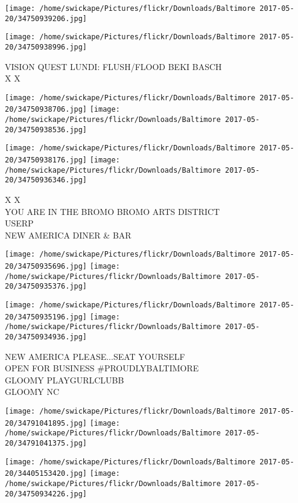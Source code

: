 \documentclass[10pt,letterpaper]{article}
\begin{document}
\texttt{[image: /home/swickape/Pictures/flickr/Downloads/Baltimore 2017-05-20/34750939206.jpg]}

\vspace{0.25in}
\texttt{[image: /home/swickape/Pictures/flickr/Downloads/Baltimore 2017-05-20/34750938996.jpg]}

VISION QUEST LUNDI: FLUSH/FLOOD BEKI BASCH\\
X X\\
\pagebreak

\texttt{[image: /home/swickape/Pictures/flickr/Downloads/Baltimore 2017-05-20/34750938706.jpg]}
\texttt{[image: /home/swickape/Pictures/flickr/Downloads/Baltimore 2017-05-20/34750938536.jpg]}

\texttt{[image: /home/swickape/Pictures/flickr/Downloads/Baltimore 2017-05-20/34750938176.jpg]}
\texttt{[image: /home/swickape/Pictures/flickr/Downloads/Baltimore 2017-05-20/34750936346.jpg]}

X X\\
YOU ARE IN THE BROMO BROMO ARTS DISTRICT\\
USERP\\
NEW AMERICA DINER \& BAR\\
\pagebreak

\texttt{[image: /home/swickape/Pictures/flickr/Downloads/Baltimore 2017-05-20/34750935696.jpg]}
\texttt{[image: /home/swickape/Pictures/flickr/Downloads/Baltimore 2017-05-20/34750935376.jpg]}

\texttt{[image: /home/swickape/Pictures/flickr/Downloads/Baltimore 2017-05-20/34750935196.jpg]}
\texttt{[image: /home/swickape/Pictures/flickr/Downloads/Baltimore 2017-05-20/34750934936.jpg]}

NEW AMERICA PLEASE...SEAT YOURSELF\\
OPEN FOR BUSINESS \#PROUDLYBALTIMORE\\
GLOOMY PLAYGURLCLUBB\\
GLOOMY NC\\
\pagebreak

\texttt{[image: /home/swickape/Pictures/flickr/Downloads/Baltimore 2017-05-20/34791041895.jpg]}
\texttt{[image: /home/swickape/Pictures/flickr/Downloads/Baltimore 2017-05-20/34791041375.jpg]}

\texttt{[image: /home/swickape/Pictures/flickr/Downloads/Baltimore 2017-05-20/34405153420.jpg]}
\texttt{[image: /home/swickape/Pictures/flickr/Downloads/Baltimore 2017-05-20/34750934226.jpg]}
\end{document}
